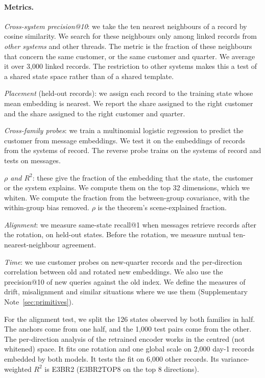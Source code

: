 \documentclass[11pt]{article}
\begin{document}
\paragraph{Metrics.}
\emph{Cross-system precision@10}: we take the ten nearest neighbours of a record by cosine similarity. We search for these neighbours only among linked records from \emph{other systems} and other threads. The metric is the fraction of these neighbours that concern the same customer, or the same customer and quarter. We average it over 3{,}000 linked records. The restriction to other systems makes this a test of a shared state space rather than of a shared template.

\emph{Placement} (held-out records): we assign each record to the training state whose mean embedding is nearest. We report the share assigned to the right customer and the share assigned to the right customer and quarter.

\emph{Cross-family probes}: we train a multinomial logistic regression to predict the customer from message embeddings. We test it on the embeddings of records from the systems of record. The reverse probe trains on the systems of record and tests on messages.

\emph{$\rho$ and $R^2$}: these give the fraction of the embedding that the state, the customer or the system explains. We compute them on the top 32 dimensions, which we whiten. We compute the fraction from the between-group covariance, with the within-group bias removed. $\rho$ is the theorem's scene-explained fraction.

\emph{Alignment}: we measure same-state recall@1 when messages retrieve records after the rotation, on held-out states. Before the rotation, we measure mutual ten-nearest-neighbour agreement.

\emph{Time}: we use customer probes on new-quarter records and the per-direction correlation between old and rotated new embeddings. We also use the precision@10 of new queries against the old index. We define the measures of drift, misalignment and similar situations where we use them (Supplementary Note~\ref{sec:primitives}).

For the alignment test, we split the 126 states observed by both families in half. The anchors come from one half, and the 1{,}000 test pairs come from the other. The per-direction analysis of the retrained encoder works in the centred (not whitened) space. It fits one rotation and one global scale on 2{,}000 day-1 records embedded by both models. It tests the fit on 6{,}000 other records. Its variance-weighted $R^2$ is E3BR2 (E3BR2TOP8 on the top 8 directions).
\end{document}
